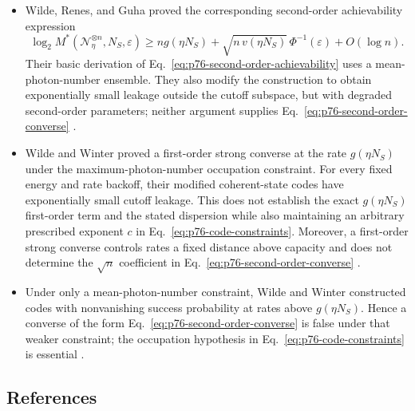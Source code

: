 \begin{itemize}
  \item Wilde, Renes, and Guha proved the corresponding second-order
  achievability expression
  \begin{equation}
    \log_2 M^*(\mathcal N_\eta^{\otimes n},N_S,\varepsilon)
    \geq ng(\eta N_S)
      +\sqrt{n\,v(\eta N_S)}\,\Phi^{-1}(\varepsilon)
      +O(\log n).
    \label{eq:p76-second-order-achievability}
  \end{equation}
  Their basic derivation of
  Eq.~\eqref{eq:p76-second-order-achievability} uses a mean-photon-number
  ensemble.  They also modify the construction to obtain exponentially small
  leakage outside the cutoff subspace, but with degraded second-order
  parameters; neither argument supplies
  Eq.~\eqref{eq:p76-second-order-converse}
  .

  \item Wilde and Winter proved a first-order strong converse at the rate
  $g(\eta N_S)$ under the maximum-photon-number occupation constraint.  For
  every fixed energy and rate backoff, their modified coherent-state codes
  have exponentially small cutoff leakage.  This does not establish the
  exact $g(\eta N_S)$ first-order term and the stated dispersion while also
  maintaining an arbitrary prescribed exponent $c$ in
  Eq.~\eqref{eq:p76-code-constraints}.  Moreover, a first-order strong
  converse controls rates a fixed distance above capacity and does not
  determine the
  $\sqrt n$ coefficient in Eq.~\eqref{eq:p76-second-order-converse}
  .

  \item Under only a mean-photon-number constraint, Wilde and Winter
  constructed codes with nonvanishing success probability at rates above
  $g(\eta N_S)$.  Hence a converse of the form
  Eq.~\eqref{eq:p76-second-order-converse} is false under that weaker
  constraint; the occupation hypothesis in
  Eq.~\eqref{eq:p76-code-constraints} is essential
  .
\end{itemize}

\subsection*{References}


